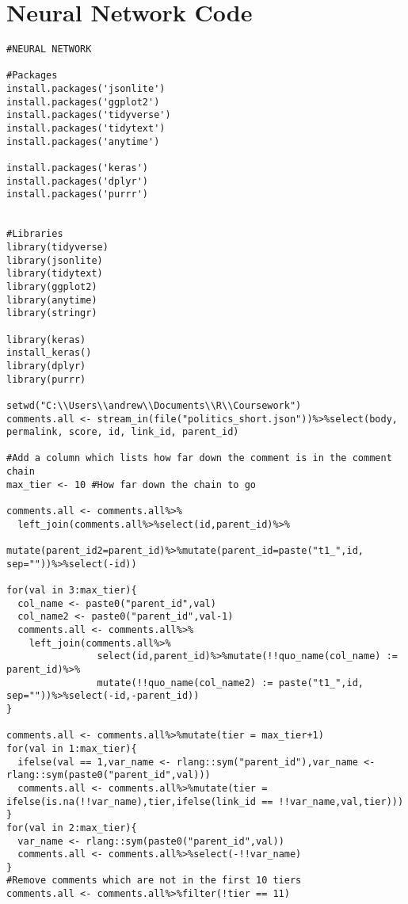 \section{Neural Network Code}
\label{sec:AppendexNeural}
\begin{lstlisting}
#NEURAL NETWORK

#Packages
install.packages('jsonlite')
install.packages('ggplot2')
install.packages('tidyverse')
install.packages('tidytext')
install.packages('anytime')

install.packages('keras')
install.packages('dplyr')
install.packages('purrr')


#Libraries
library(tidyverse)
library(jsonlite)
library(tidytext)
library(ggplot2)
library(anytime)
library(stringr)

library(keras)
install_keras()
library(dplyr)
library(purrr)

setwd("C:\\Users\\andrew\\Documents\\R\\Coursework")
comments.all <- stream_in(file("politics_short.json"))%>%select(body, permalink, score, id, link_id, parent_id)

#Add a column which lists how far down the comment is in the comment chain
max_tier <- 10 #How far down the chain to go

comments.all <- comments.all%>%
  left_join(comments.all%>%select(id,parent_id)%>%
              mutate(parent_id2=parent_id)%>%mutate(parent_id=paste("t1_",id, sep=""))%>%select(-id))

for(val in 3:max_tier){
  col_name <- paste0("parent_id",val)
  col_name2 <- paste0("parent_id",val-1)
  comments.all <- comments.all%>%
    left_join(comments.all%>%
                select(id,parent_id)%>%mutate(!!quo_name(col_name) := parent_id)%>%
                mutate(!!quo_name(col_name2) := paste("t1_",id, sep=""))%>%select(-id,-parent_id))
}

comments.all <- comments.all%>%mutate(tier = max_tier+1)
for(val in 1:max_tier){
  ifelse(val == 1,var_name <- rlang::sym("parent_id"),var_name <- rlang::sym(paste0("parent_id",val)))
  comments.all <- comments.all%>%mutate(tier = ifelse(is.na(!!var_name),tier,ifelse(link_id == !!var_name,val,tier)))
}
for(val in 2:max_tier){
  var_name <- rlang::sym(paste0("parent_id",val))
  comments.all <- comments.all%>%select(-!!var_name)
}
#Remove comments which are not in the first 10 tiers
comments.all <- comments.all%>%filter(!tier == 11)


\end{lstlisting}
